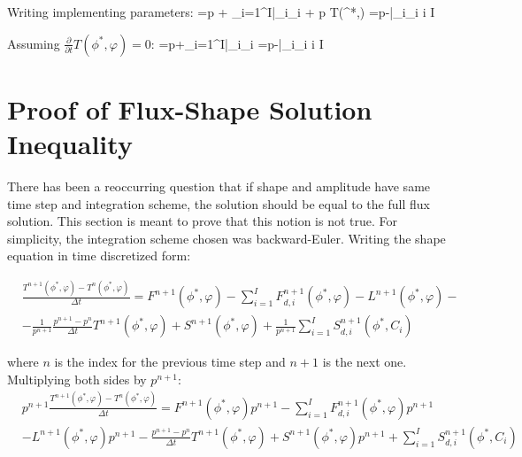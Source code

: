 Writing implementing parameters:
\be
{}=\left[\frac{\rho-\bar{\beta}}{\Lambda}\right]p + \sum_{i=1}^I\bar{\lambda}_i\xi_i + p T(\phi^{*},\varphi)
\ee
\be
{}=p-\bar{\lambda}_i\xi_i  \le i \le I 
\ee

Assuming $\frac{\partial}{\partial t} T(\phi^{*},\varphi) = 0$:
\be
{}=\left[\frac{\rho-\bar{\beta}}{\Lambda}\right]p+\sum_{i=1}^I\bar{\lambda}_i\xi_i
\label{eq:p}
\ee
\be
{}=p-\bar{\lambda}_i\xi_i  \le i \le I 
\label{eq:xi}
\ee

\section{Proof of Flux-Shape Solution Inequality}

There has been a reoccurring question that if shape and amplitude have same time step and integration scheme, the solution should be equal to the full flux solution.  This section is meant to prove that this notion is not true.  For simplicity, the integration scheme chosen was backward-Euler.  Writing the shape equation in time discretized form:

\begin{align}
&\frac{T^{n+1}(\phi^{*},\varphi)-T^{n}(\phi^{*},\varphi)}{\Delta t} = F^{n+1}(\phi^{*},\varphi) - \sum_{i=1}^I F_{d,i}^{n+1}(\phi^{*},\varphi) - L^{n+1}(\phi^{*},\varphi) -  \nonumber \\
&- \frac{1}{p^{n+1}}\frac{p^{n+1} - p^n}{\Delta t}T^{n+1}(\phi^{*},\varphi) + S^{n+1}(\phi^{*},\varphi) + \frac{1}{p^{n+1}}\sum_{i=1}^I S_{d,i}^{n+1}(\phi^{*},C_i)
\end{align}

where $n$ is the index for the previous time step and $n+1$ is the next one.  Multiplying both sides by $p^{n+1}$:
\begin{align}
&p^{n+1}\frac{T^{n+1}(\phi^{*},\varphi)-T^{n}(\phi^{*},\varphi)}{\Delta t} = F^{n+1}(\phi^{*},\varphi)p^{n+1} - \sum_{i=1}^I F_{d,i}^{n+1}(\phi^{*},\varphi)p^{n+1} \nonumber \\
& - L^{n+1}(\phi^{*},\varphi)p^{n+1} - \frac{p^{n+1} - p^n}{\Delta t}T^{n+1}(\phi^{*},\varphi) + S^{n+1}(\phi^{*},\varphi)p^{n+1} + \sum_{i=1}^I S_{d,i}^{n+1}(\phi^{*},C_i)
\end{align}

